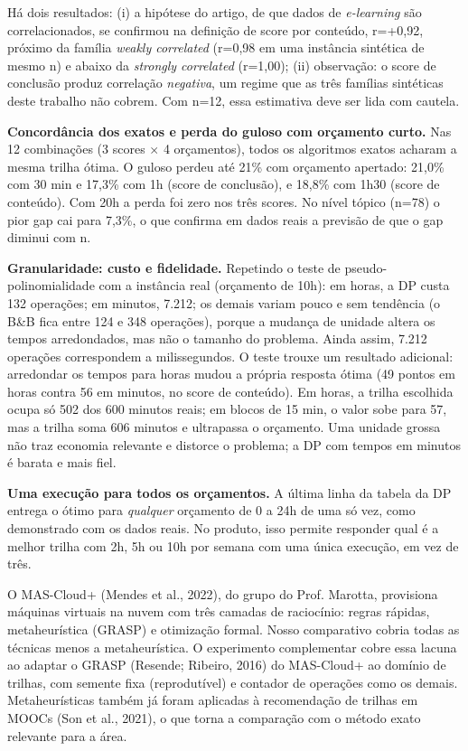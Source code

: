 \documentclass[12pt,a4paper]{article}
\newcommand{\secao}[1]{\par\vspace{1.2em}\noindent{\bfseries #1}\par\vspace{0.8em}\nopagebreak}
\begin{document}
Há dois resultados: (i) a hipótese do artigo, de que dados de \textit{e-learning} são correlacionados, se confirmou na definição de score por conteúdo, r=+0,92, próximo da família \textit{weakly correlated} (r=0,98 em uma instância sintética de mesmo n) e abaixo da \textit{strongly correlated} (r=1,00); (ii) observação: o score de conclusão produz correlação \textit{negativa}, um regime que as três famílias sintéticas deste trabalho não cobrem. Com n=12, essa estimativa deve ser lida com cautela.

\textbf{Concordância dos exatos e perda do guloso com orçamento curto.} Nas 12 combinações (3 scores \ensuremath{\times} 4 orçamentos), todos os algoritmos exatos acharam a mesma trilha ótima. O guloso perdeu até 21\% com orçamento apertado: 21,0\% com 30 min e 17,3\% com 1h (score de conclusão), e 18,8\% com 1h30 (score de conteúdo). Com 20h a perda foi zero nos três scores. No nível tópico (n=78) o pior gap cai para 7,3\%, o que confirma em dados reais a previsão de que o gap diminui com n.

\textbf{Granularidade: custo e fidelidade.} Repetindo o teste de pseudo-polinomialidade com a instância real (orçamento de 10h): em horas, a DP custa 132 operações; em minutos, 7.212; os demais variam pouco e sem tendência (o B\&B fica entre 124 e 348 operações), porque a mudança de unidade altera os tempos arredondados, mas não o tamanho do problema. Ainda assim, 7.212 operações correspondem a milissegundos. O teste trouxe um resultado adicional: arredondar os tempos para horas mudou a própria resposta ótima (49 pontos em horas contra 56 em minutos, no score de conteúdo). Em horas, a trilha escolhida ocupa só 502 dos 600 minutos reais; em blocos de 15 min, o valor sobe para 57, mas a trilha soma 606 minutos e ultrapassa o orçamento. Uma unidade grossa não traz economia relevante e distorce o problema; a DP com tempos em minutos é barata e mais fiel.

\textbf{Uma execução para todos os orçamentos.} A última linha da tabela da DP entrega o ótimo para \textit{qualquer} orçamento de 0 a 24h de uma só vez, como demonstrado com os dados reais. No produto, isso permite responder qual é a melhor trilha com 2h, 5h ou 10h por semana com uma única execução, em vez de três.

\secao{7 EXPERIMENTO COMPLEMENTAR: METAHEURÍSTICA GRASP}
O MAS-Cloud+ (Mendes et al., 2022), do grupo do Prof. Marotta, provisiona máquinas virtuais na nuvem com três camadas de raciocínio: regras rápidas, metaheurística (GRASP) e otimização formal. Nosso comparativo cobria todas as técnicas menos a metaheurística. O experimento complementar cobre essa lacuna ao adaptar o GRASP (Resende; Ribeiro, 2016) do MAS-Cloud+ ao domínio de trilhas, com semente fixa (reprodutível) e contador de operações como os demais. Metaheurísticas também já foram aplicadas à recomendação de trilhas em MOOCs (Son et al., 2021), o que torna a comparação com o método exato relevante para a área.
\end{document}
